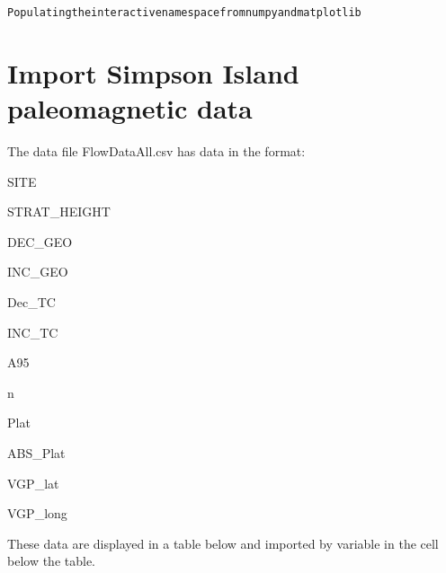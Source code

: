 \documentclass[letterpaper,10pt,english]{/Users/polarwander/Library/Enthought/Canopy_64bit/User/lib/python2.7/site-packages/sphinx/texinputs/sphinxhowto}
\newenvironment{InvisibleVerbatim}
        {\begin{mdframed}[leftmargin=0.1\linewidth,innerleftmargin=3pt,innerrightmargin=3pt, userdefinedwidth=1\linewidth, linewidth=0pt, linecolor=white, usetwoside=false]}
        {\end{mdframed}}
\begin{document}
    

        
        

            
                \begin{InvisibleVerbatim}
                \vspace{-0.5\baselineskip}
\begin{alltt}Populating the interactive namespace from numpy and matplotlib
\end{alltt}

            \end{InvisibleVerbatim}
            
        
    
\section{Import Simpson Island paleomagnetic data}The data file FlowDataAll.csv has data in the format:

SITE

STRAT\_HEIGHT

DEC\_GEO

INC\_GEO

Dec\_TC

INC\_TC

A95

n

Plat

ABS\_Plat

VGP\_lat

VGP\_long

These data are displayed in a table below and imported by variable in
the cell below the table.

\end{document}
